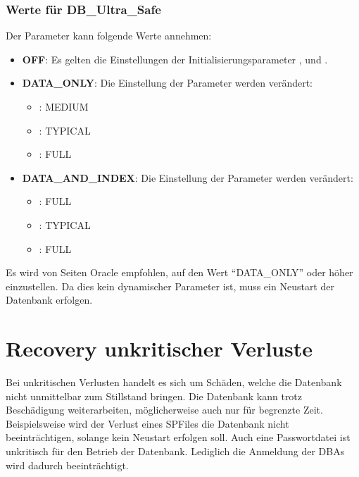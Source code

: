         \subsubsection{Werte für DB\_Ultra\_Safe}
          Der Parameter  kann folgende Werte annehmen:
          \begin{itemize}
            \item \textbf{OFF}: Es gelten die Einstellungen der Initialisierungsparameter ,  und .
            \item \textbf{DATA\_ONLY}: Die Einstellung der Parameter werden verändert:
              \begin{itemize}
                \item {}: MEDIUM
                \item {}: TYPICAL
                \item {}: FULL
              \end{itemize}
            \item \textbf{DATA\_AND\_INDEX}: Die Einstellung der Parameter werden verändert:
              \begin{itemize}
                \item {}: FULL
                \item {}: TYPICAL
                \item {}: FULL
              \end{itemize}
          \end{itemize}
          Es wird von Seiten Oracle empfohlen,  auf den Wert \enquote{DATA\_ONLY} oder höher einzustellen. Da dies kein dynamischer Parameter ist, muss ein Neustart der Datenbank erfolgen.
    \section{Recovery unkritischer Verluste}
      Bei unkritischen Verlusten handelt es sich um Schäden, welche die Datenbank nicht unmittelbar zum Stillstand bringen. Die Datenbank kann trotz Beschädigung weiterarbeiten, möglicherweise auch nur für begrenzte Zeit. Beispielsweise wird der Verlust eines SPFiles die Datenbank nicht beeinträchtigen, solange kein Neustart erfolgen soll. Auch eine Passwortdatei ist unkritisch für den Betrieb der Datenbank. Lediglich die Anmeldung der DBAs wird dadurch beeinträchtigt.
